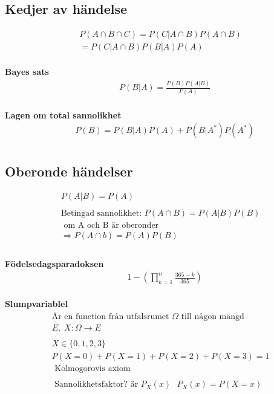 \begin{multicols}{2}
\subsection{Kedjer av händelse}
\begin{align*}
  &P(A\cap{B}\cap{C}) = P(C|A\cap{B})P(A\cap{B}) \\
  &= P(C|A\cap{B})P(B|A)P(A)  \\
\end{align*}

\textbf{Bayes sats}
\begin{align*}
  &\quad  P(B|A) = \frac{P(B)P(A|B)}{P(A)}  \\
\end{align*}

\textbf{Lagen om total sannolikhet}
\begin{align*}
  &\quad  P(B) = P(B|A)P(A) + P(B|A^*)P(A^*) \\
\end{align*}

\subsection{Oberonde händelser}
\begin{align*}
  &P(A|B)=P(A) \\
  & \\
  &\text{Betingad sannolikhet: } P(A\cap{B})=P(A|B)P(B) \\
  &\text{ om A och B är oberonder } \\
  &\Rightarrow P(A\cap{b}) = P(A)P(B) \\
  & \\
\end{align*}

\textbf{Födelsedagsparadoksen}
\begin{align*}
  &\quad  1-(\prod_{k = 1}^{n} \frac{365-k}{365}) \\
\end{align*}

\textbf{Slumpvariablel}
\begin{align*}
  &\text{Är en function från utfalsrumet $\Omega$ till någon mängd} \\
  & E,\; X:\Omega\to{E} \\
  & \\ %
  &X\in\{0,1,2,3\} \\
  &P(X=0)+P(X=1)+P(X=2)+P(X=3)=1 \\
  &\text{ Kolmogorovis axiom } \\
  & \\
  &\text{ Sannolikhetsfaktor? är $P_X(x)$ } P_X(x)=P(X=x) \\
\end{align*}


\end{multicols}
